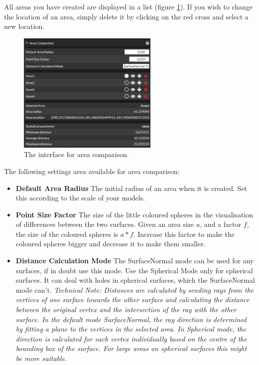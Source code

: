 All areas you have created are displayed in a list (figure \ref{fig:surfaceComparisonAreaGui}). If you wish to change the location of an area, simply delete it by clicking on the red cross and select a new location. 

\begin{figure}[h]
	\centering
	\includegraphics[width=0.6\textwidth]{pics/surfaceComparisonAreaGui.PNG}
	\caption[The interface for area comparison.]{The interface for area comparison.}
	\label{fig:surfaceComparisonAreaGui}
\end{figure}

The following settings area available for area comparison:

\begin{itemize}
	\item \textbf{Default Area Radius} The initial radius of an area when it is created. Set this according to the scale of your models.
	\item \textbf{Point Size Factor} The size of the little coloured spheres in the visualisation of differences between the two surfaces. Given an area size $a$, and a factor $f$, the size of the coloured spheres is $a * f$. Increase this factor to make the coloured spheres bigger and decrease it to make them smaller.
	\item \textbf{Distance Calculation Mode} The SurfaceNormal mode can be used for any surfaces, if in doubt use this mode. Use the Spherical Mode only for spherical surfaces. It can deal with holes in spherical surfaces, which the SurfaceNormal mode can't. \emph{Technical Note: Distances are calculated by sending rays from the vertices of one surface towards the other surface and calculating the distance between the original vertex and the intersection of the ray with the other surface. In the default mode \emph{SurfaceNormal}, the ray direction is determined by fitting a plane to the vertices in the selected area. In Spherical mode, the direction is calculated for each vertex individually based on the centre of the bounding box of the surface. For large areas on spherical surfaces this might be more suitable.}
\end{itemize}


